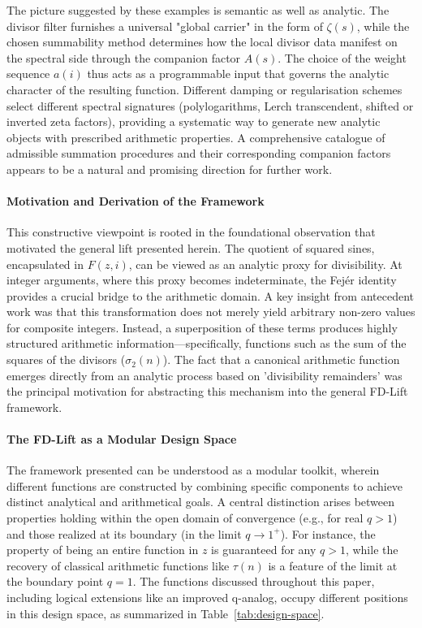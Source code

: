 \noindent The picture suggested by these examples is semantic as well as analytic. The divisor filter furnishes a universal "global carrier" in the form of $\zeta(s)$, while the chosen summability method determines how the local divisor data manifest on the spectral side through the companion factor $A(s)$. The choice of the weight sequence $a(i)$ thus acts as a programmable input that governs the analytic character of the resulting function. Different damping or regularisation schemes select different spectral signatures (polylogarithms, Lerch transcendent, shifted or inverted zeta factors), providing a systematic way to generate new analytic objects with prescribed arithmetic properties. A comprehensive catalogue of admissible summation procedures and their corresponding companion factors appears to be a natural and promising direction for further work.

\paragraph{Motivation and Derivation of the Framework}
This constructive viewpoint is rooted in the foundational observation that motivated the general lift presented herein. The quotient of squared sines, encapsulated in $F(z,i)$, can be viewed as an analytic proxy for divisibility. At integer arguments, where this proxy becomes indeterminate, the Fej\'er identity provides a crucial bridge to the arithmetic domain. A key insight from antecedent work was that this transformation does not merely yield arbitrary non-zero values for composite integers. Instead, a superposition of these terms produces highly structured arithmetic information—specifically, functions such as the sum of the squares of the divisors ($\sigma_2(n)$). The fact that a canonical arithmetic function emerges directly from an analytic process based on 'divisibility remainders' was the principal motivation for abstracting this mechanism into the general FD-Lift framework.

\paragraph{The FD-Lift as a Modular Design Space}
The framework presented can be understood as a modular toolkit, wherein different functions are constructed by combining specific components to achieve distinct analytical and arithmetical goals. A central distinction arises between properties holding within the open domain of convergence (e.g., for real $q>1$) and those realized at its boundary (in the limit $q \to 1^+$). For instance, the property of being an entire function in $z$ is guaranteed for any $q>1$, while the recovery of classical arithmetic functions like $\tau(n)$ is a feature of the limit at the boundary point $q=1$. The functions discussed throughout this paper, including logical extensions like an improved q-analog, occupy different positions in this design space, as summarized in Table~\ref{tab:design-space}.

